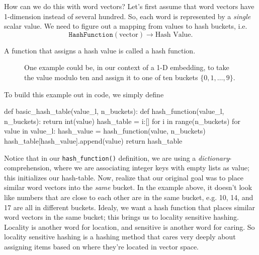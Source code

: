 \documentclass[12pt]{article}
\begin{document}
How can we do this with word vectors? Let's first assume that word vectors have 1-dimension instead of several hundred. So, each word is represented by a \emph{single} scalar value. We need to figure out a mapping from values to hash buckets, i.e.
\[
  \texttt{HashFunction}(\textrm{vector}) \longrightarrow \textrm{Hash Value}.
\]

A function that assigns a hash value is called a hash function.

\begin{figure}
  \begin{center}
  \end{center}
  \caption{One example could be, in our context of a 1-D embedding, to take the value modulo ten and assign it to one of ten buckets $\{0,1,\ldots,9\}$.}
\end{figure}

To build this example out in code, we simply define

\begin{python}
def basic_hash_table(value_l, n_buckets):
  def hash_function(value_l, n_buckets):
    return int(value) %
  hash_table = {i:[] for i in range(n_buckets)}
  for value in value_l:
    hash_value = hash_function(value, n_buckets)
    hash_table[hash_value].append(value)
  return hash_table
\end{python}

Notice that in our \texttt{hash\_function()} definition, we are using a \emph{dictionary}-comprehension, where we are associating integer keys with empty lists as value; this initializes our hash-table. Now, realize that our original goal was to place similar word vectors into the \emph{same} bucket. In the example above, it doesn't look like numbers that are close to each other are in the same bucket, e.g. 10, 14, and 17 are all in different buckets. Idealy, we want a hash function that places similar word vectors in the same bucket; this brings us to locality sensitive hashing. Locality is another word for location, and sensitive is another word for caring. So locality sensitive hashing is a hashing method that cares very deeply about assigning items based on where they're located in vector space.
\end{document}

